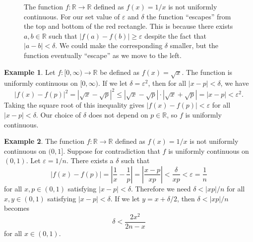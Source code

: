\documentclass{article}
\newcommand{\R}{\mathbb{R}}
\theoremstyle{definition}
\newtheorem{example}{Example}[section]
\begin{document}
	\begin{figure}[h!]
		\centering
		\caption{The function $ f:\R\to\R $ defined as $ f(x)=1/x $ is not uniformly continuous. For our set value of $ \varepsilon $ and $ \delta $ the function ``escapes'' from the top and bottom of the red rectangle. This is because there exists $ a,b\in\R $ such that $ |f(a)-f(b)|\ge\varepsilon $ despite the fact that $ |a-b|<\delta $. We could make the corresponding $ \delta $ smaller, but the function eventually ``escape'' as we move to the left. }
	\end{figure}
	\begin{example}
		Let $ f:[0,\infty)\to\R $ be defined as $ f(x)=\sqrt{x} $. The function is uniformly continuous on $ [0,\infty) $. If we let $ \delta=\varepsilon^2 $, then for all $ |x-p|<\delta $, we have $$|f(x)-f(p)|^2=|\sqrt{x}-\sqrt{p}|^2\le|\sqrt{x}-\sqrt{p}|\cdot|\sqrt{x}+\sqrt{p}|=|x-p|<\varepsilon^2 .$$ Taking the square root of this inequality gives $ |f(x)-f(p)|<\varepsilon $ for all $ |x-p|<\delta $. Our choice of $ \delta $ does not depend on $ p\in\R $, so $ f $ is uniformly continuous. 
	\end{example}
	\begin{example}
		The function $ f:\R\to\R $ defined as $ f(x)=1/x $ is not uniformly continuous on $ (0,1] $. Suppose for contradiction that $ f $ is uniformly continuous on $ (0,1) $. Let $ \varepsilon=1/n $. There exists a $ \delta $ such that $$ |f(x)-f(p)|=\left\lvert\frac{1}{x}-\frac{1}{p}\right\rvert=\left\lvert\frac{x-p}{xp}\right\rvert<\frac{\delta}{xp}<\varepsilon=\frac{1}{n} $$ for all $ x,p\in(0,1) $ satisfying $ |x-p|<\delta $. Therefore we need $ \delta<|xp|/n $ for all $ x,y\in(0,1) $ satisfying $ |x-p|<\delta $. If we let $ y=x+\delta/2 $, then $ \delta<|xp|/n $ becomes $$\delta <\frac{2x^2}{2n-x} $$ for all $ x\in(0,1) $. 
	\end{example}
\end{document}
